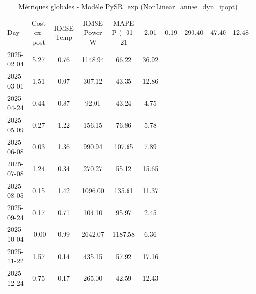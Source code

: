 \begin{table}
\caption{Métriques globales - Modèle PySR_exp (NonLinear_annee_dyn_ipopt)}
\label{tab:PySR_exp_NonLinear_annee_dyn_ipopt_Validation_EPlus_sans_Opti}
\begin{small}
\begin{tabular}{lccccc}
\toprule
Day & Cost ex-post & RMSE Temp & RMSE Power W & MAPE P (%
-01-21 & 2.01 & 0.19 & 290.40 & 47.40 & 12.48 \\
2025-02-04 & 5.27 & 0.76 & 1148.94 & 66.22 & 36.92 \\
2025-03-01 & 1.51 & 0.07 & 307.12 & 43.35 & 12.86 \\
2025-04-24 & 0.44 & 0.87 & 92.01 & 43.24 & 4.75 \\
2025-05-09 & 0.27 & 1.22 & 156.15 & 76.86 & 5.78 \\
2025-06-08 & 0.03 & 1.36 & 990.94 & 107.65 & 7.89 \\
2025-07-08 & 1.24 & 0.34 & 270.27 & 55.12 & 15.65 \\
2025-08-05 & 0.15 & 1.42 & 1096.00 & 135.61 & 11.37 \\
2025-09-24 & 0.17 & 0.71 & 104.10 & 95.97 & 2.45 \\
2025-10-04 & -0.00 & 0.99 & 2642.07 & 1187.58 & 6.36 \\
2025-11-22 & 1.57 & 0.14 & 435.15 & 57.92 & 17.16 \\
2025-12-24 & 0.75 & 0.17 & 265.00 & 42.59 & 12.43 \\
\bottomrule
\end{tabular}
\end{small}
\end{table}
